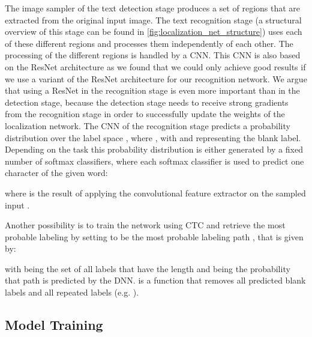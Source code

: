 \documentclass[10pt,twocolumn,letterpaper]{article}
\begin{document}
The image sampler of the text detection stage produces a set of  regions that are extracted from the original input image.
The text recognition stage (a structural overview of this stage can be found in \autoref{fig:localization_net_structure}) uses each of these  different regions and processes them independently of each other.
The processing of the  different regions is handled by a \ac{CNN}.
This \ac{CNN} is also based on the ResNet architecture as we found that we could only achieve good results if we use a variant of the ResNet architecture for our recognition network.
We argue that using a ResNet in the recognition stage is even more important than in the detection stage, because the detection stage needs to receive strong gradients from the recognition stage in order to successfully update the weights of the localization network.
The \ac{CNN} of the recognition stage predicts a probability distribution  over the label space , where , with  and  representing the blank label.
Depending on the task this probability distribution is either generated by a fixed number of  softmax classifiers, where each softmax classifier is used to predict one character of the given word:

where  is the result of applying the convolutional feature extractor on the sampled input .

Another possibility is to train the network using \ac{CTC} \cite{Graves2006Connectionist} and retrieve the most probable labeling by setting  to be the most probable labeling path , that is given by:

with  being the set of all labels that have the length  and  being the probability that path  is predicted by the \ac{DNN}.  is a function that removes all predicted blank labels and all repeated labels (e.g. ).

\subsection{Model Training}
\end{document}
